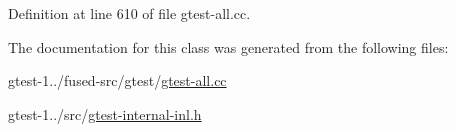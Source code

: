 \-Definition at line 610 of file gtest-\/all.\-cc.



\-The documentation for this class was generated from the following files\-:\begin{DoxyCompactItemize}
\item 
gtest-\/1../fused-\/src/gtest/\hyperlink{fused-src_2gtest_2gtest-all_8cc}{gtest-\/all.\-cc}\item 
gtest-\/1../src/\hyperlink{gtest-internal-inl_8h}{gtest-\/internal-\/inl.\-h}\end{DoxyCompactItemize}
